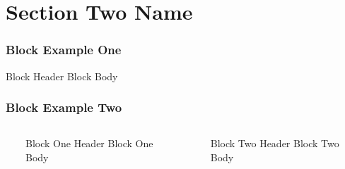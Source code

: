 \documentclass{beamer}
\begin{document}
\section{Section Two Name} 

\begin{frame}
\frametitle{Block Example One}
\begin{block}{Block Header}
	Block Body
\end{block}
\end{frame}

\begin{frame}
\frametitle{Block Example Two}
\begin{columns}
  \ 
	\begin{block}{Block One Header} 
		Block One Body 
	\end{block} 
 \ 
	\begin{block}{Block Two Header} 
		Block Two Body
	\end{block} 
\end{columns}
\end{frame}
\end{document}
